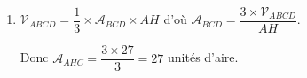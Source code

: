 \documentclass[10pt]{article}
\providecommand{\vect}[1]{\overrightarrow{#1}}
\begin{document}
\begin{enumerate}
\begin{enumerate}
		Donc $\vect{AH}$ est orthogonal aux vecteurs $\vect{BC}$ et $\vect{BD}$, donc à toute combinaison linéaire de ces deux vecteurs, donc à tout vecteur du plan $(BCD)$. Donc $H$ est le projeté orthogonal de $A$ sur le plan $(BCD)$.
		\item La distance du point $A$ au plan $(BCD)$ est égale à $\lVert\vect{AH}\rVert$ :
		
		$\lVert\vect{AH}\rVert=\sqrt{2^2+2^2+(-1)^2}=\sqrt{9}=3$ unités de longueur.
\end{enumerate}
\item $\mathcal{V}_{ABCD}=\dfrac{1}{3}\times \mathcal{A}_{BCD}\times AH$ d'où $\mathcal{A}_{BCD}=\dfrac{3\times \mathcal{V}_{ABCD}}{AH}$.


Donc $\mathcal{A}_{AHC}=\dfrac{3\times 27}{3}=27$ unités d'aire. 
\end{enumerate}
\bigskip
\end{document}
